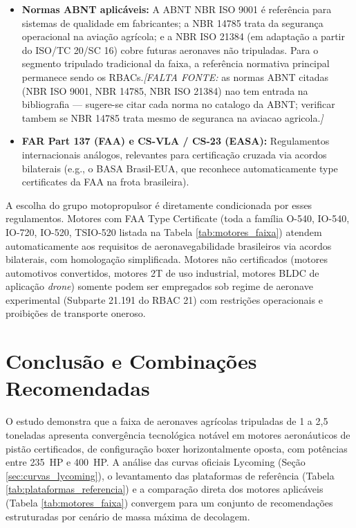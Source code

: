 \documentclass[a4paper,12pt]{article}
\newcommand{\citesugerida}[1]{{\color{red}\textit{[FALTA FONTE: }#1\textit{]}}}
\begin{document}
\begin{itemize}
    \item \textbf{Normas ABNT aplicáveis:} A ABNT NBR ISO 9001 é referência para sistemas de qualidade em fabricantes; a NBR 14785 trata da segurança operacional na aviação agrícola; e a NBR ISO 21384 (em adaptação a partir do ISO/TC 20/SC 16) cobre futuras aeronaves não tripuladas. Para o segmento tripulado tradicional da faixa, a referência normativa principal permanece sendo os RBACs.\citesugerida{as normas ABNT citadas (NBR ISO 9001, NBR 14785, NBR ISO 21384) nao tem entrada na bibliografia --- sugere-se citar cada norma no catalogo da ABNT; verificar tambem se NBR 14785 trata mesmo de seguranca na aviacao agricola.}
    
    \item \textbf{FAR Part 137 (FAA) e CS-VLA / CS-23 (EASA):} Regulamentos internacionais análogos, relevantes para certificação cruzada via acordos bilaterais (e.g., o BASA Brasil-EUA, que reconhece automaticamente type certificates da FAA na frota brasileira).
\end{itemize}

A escolha do grupo motopropulsor é diretamente condicionada por esses regulamentos. Motores com FAA Type Certificate (toda a família O-540, IO-540, IO-720, IO-520, TSIO-520 listada na Tabela \ref{tab:motores_faixa}) atendem automaticamente aos requisitos de aeronavegabilidade brasileiros via acordos bilaterais, com homologação simplificada. Motores não certificados (motores automotivos convertidos, motores 2T de uso industrial, motores BLDC de aplicação \textit{drone}) somente podem ser empregados sob regime de aeronave experimental (Subparte 21.191 do RBAC 21) com restrições operacionais e proibições de transporte oneroso.

\section{Conclusão e Combinações Recomendadas}

O estudo demonstra que a faixa de aeronaves agrícolas tripuladas de 1 a 2{,}5 toneladas apresenta convergência tecnológica notável em motores aeronáuticos de pistão certificados, de configuração boxer horizontalmente oposta, com potências entre \SI{235}{HP} e \SI{400}{HP}. A análise das curvas oficiais Lycoming (Seção \ref{sec:curvas_lycoming}), o levantamento das plataformas de referência (Tabela \ref{tab:plataformas_referencia}) e a comparação direta dos motores aplicáveis (Tabela \ref{tab:motores_faixa}) convergem para um conjunto de recomendações estruturadas por cenário de massa máxima de decolagem.
\end{document}
